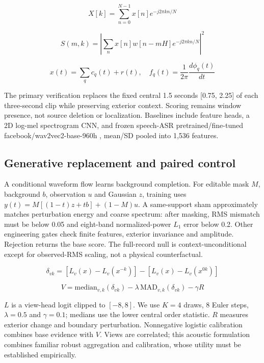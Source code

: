 \documentclass[11pt,letterpaper]{article}
\begin{document}
\begin{equation}\label{eq:fourier}
X[k]=\sum_{n=0}^{N-1}x[n]e^{-j2\pi kn/N}
\end{equation}

\begin{equation}\label{eq:stft}
S(m,k)=\left|\sum_n x[n]w[n-mH]e^{-j2\pi kn/N}\right|^2
\end{equation}

\begin{equation}\label{eq:hht}
x(t)=\sum_q c_q(t)+r(t),\quad f_q(t)=\frac{1}{2\pi}\frac{d\phi_q(t)}{dt}
\end{equation}

The primary verification replaces the fixed central 1.5 seconds [0.75, 2.25] of each three-second clip while preserving exterior context. Scoring remains window presence, not source deletion or localization. Baselines include feature heads, a 2D log-mel spectrogram CNN, and frozen speech-ASR pretrained/fine-tuned facebook/wav2vec2-base-960h \cite{wav2vec2}, mean/SD pooled into 1,536 features.\par

\subsection{Generative replacement and paired control}

A conditional waveform flow \cite{flowmatching} learns background completion. For editable mask \(M\), background \(b\), observation \(u\) and Gaussian \(z\), training uses \(y(t)=M[(1-t)z+tb]+(1-M)u\). A same-support sham approximately matches perturbation energy and coarse spectrum: after masking, RMS mismatch must be below 0.05 and eight-band normalized-power \(L_1\) error below 0.2. Other engineering gates check finite features, exterior invariance and amplitude. Rejection returns the base score. The full-record null is context-unconditional except for observed-RMS scaling, not a physical counterfactual.\par

\begin{equation}\label{eq:delta}
\delta_{vk}=[L_v(x)-L_v(x^{-k})]-[L_v(x)-L_v(x^{0k})]
\end{equation}

\begin{equation}\label{eq:score}
V=\mathrm{median}_{v,k}(\delta_{vk})-\lambda\,\mathrm{MAD}_{v,k}(\delta_{vk})-\gamma R
\end{equation}

\(L\) is a view-head logit clipped to \([-8,8]\). We use \(K=4\) draws, 8 Euler steps, \(\lambda=0.5\) and \(\gamma=0.1\); medians use the lower central order statistic. \(R\) measures exterior change and boundary perturbation. Nonnegative logistic calibration combines base evidence with \(V\). Views are correlated; this acoustic formulation combines familiar robust aggregation and calibration, whose utility must be established empirically.\par
\end{document}

